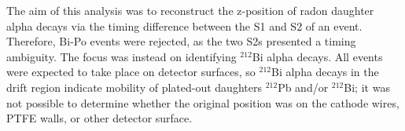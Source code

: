 

The aim of this analysis was to reconstruct the z-position of radon daughter alpha decays via the timing difference between the S1 and S2 of an event. Therefore, Bi-Po events were rejected, as the two S2s presented a timing ambiguity. The focus was instead on identifying $^{212}$Bi alpha decays. All events were expected to take place on detector surfaces, so $^{212}$Bi alpha decays in the drift region indicate mobility of plated-out daughters $^{212}$Pb and/or $^{212}$Bi; it was not possible to determine whether the original position was on the cathode wires, \ac{PTFE} walls, or other detector surface.

